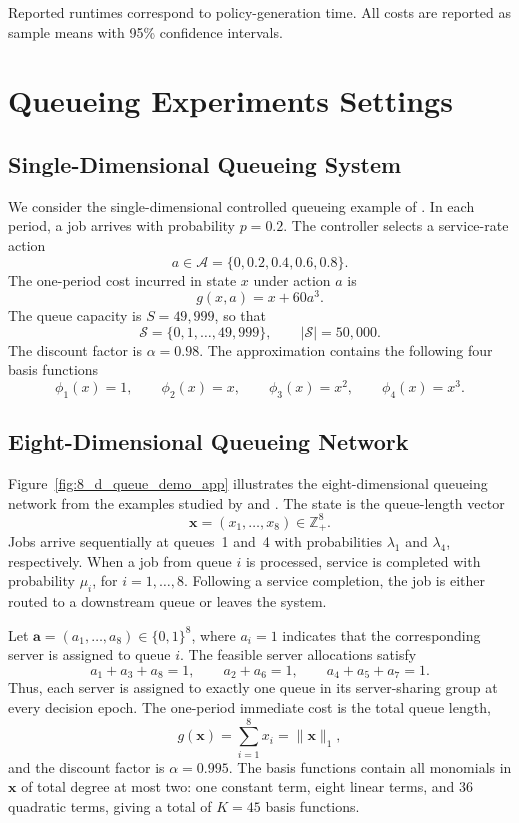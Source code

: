 \documentclass[sglanonrev]{informs4}
\providecommand{\ba}{\boldsymbol{a}}
\providecommand{\bx}{\boldsymbol{x}}
\begin{document}
\begin{APPENDICES}
Reported runtimes correspond to policy-generation time. All costs are reported as sample means with 95\% confidence intervals. 



\section{Queueing Experiments Settings}
\label{app:queue}

\subsection{Single-Dimensional Queueing System}
\label{app:single_queue}

We consider the single-dimensional controlled queueing example of \citet{de2003linear}. In each period, a job arrives with probability $p=0.2$. The controller selects a service-rate action
\[
a\in\mathcal A
=
\{0,0.2,0.4,0.6,0.8\}.
\]
The one-period cost incurred in state $x$ under action $a$ is
\[
g(x,a)=x+60a^3.
\]
The queue capacity is $S=49{,}999$, so that
\[
\mathcal S=\{0,1,\ldots,49{,}999\},
\qquad
|\mathcal S|=50{,}000.
\]
The discount factor is $\alpha=0.98$. The approximation contains the following four basis functions
\[
\phi_1(x)=1,
\qquad
\phi_2(x)=x,
\qquad
\phi_3(x)=x^2,
\qquad
\phi_4(x)=x^3.
\]

\subsection{Eight-Dimensional Queueing Network}
\label{app:8d_queue}
Figure~\ref{fig:8_d_queue_demo_app} illustrates the eight-dimensional queueing network from the examples studied by \citet{de2003linear} and \citet{de2008choosing}. The state is the queue-length vector
\[
\bx=(x_1,\ldots,x_8)\in\mathbb Z_+^8.
\]
Jobs arrive sequentially at queues~1 and~4 with probabilities $\lambda_1$ and $\lambda_4$, respectively. When a job from queue $i$ is processed, service is completed with probability $\mu_i$, for $i=1,\ldots,8$. Following a service completion, the job is either routed to a downstream queue or leaves the system.

Let $\ba=(a_1,\ldots,a_8)\in\{0,1\}^8$, where $a_i=1$ indicates that the corresponding server is assigned to queue $i$. The feasible server allocations satisfy
\[
a_1+a_3+a_8=1,
\qquad
a_2+a_6=1,
\qquad
a_4+a_5+a_7=1.
\]
Thus, each server is assigned to exactly one queue in its server-sharing group at every decision epoch. 
The one-period immediate cost is the total queue length,
\[
g(\bx)=\sum_{i=1}^8x_i=\|\bx\|_1,
\]
and the discount factor is $\alpha=0.995$. The basis functions contain all monomials in $\bx$ of total degree at most two: one constant term, eight linear terms, and 36 quadratic terms, giving a total of $K=45$ basis functions.


\end{APPENDICES}
\end{document}
